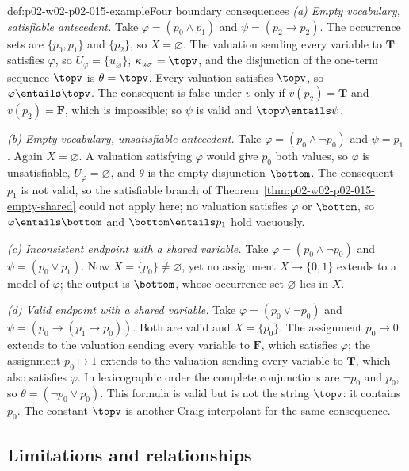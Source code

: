 \begin{hbexample}{def:p02-w02-p02-015-example}{Four boundary consequences}
\emph{(a) Empty vocabulary, satisfiable antecedent.}
Take \(\varphi=(p_0\land p_1)\) and \(\psi=(p_2\to p_2)\).  The occurrence
sets are \(\{p_0,p_1\}\) and \(\{p_2\}\), so \(X=\varnothing\).  The
valuation sending every variable to \(\mathbf{T}\) satisfies \(\varphi\), so
\(U_\varphi=\{u_\varnothing\}\), \(\kappa_{u_\varnothing}=\topv\), and the
disjunction of the one-term sequence \(\topv\) is \(\theta=\topv\).  Every
valuation satisfies \(\topv\), so \(\varphi\entails\topv\).  The consequent is
false under \(v\) only if \(v(p_2)=\mathbf{T}\) and \(v(p_2)=\mathbf{F}\), which is
impossible; so \(\psi\) is valid and \(\topv\entails\psi\).

\emph{(b) Empty vocabulary, unsatisfiable antecedent.}
Take \(\varphi=(p_0\land\neg p_0)\) and \(\psi=p_1\).  Again \(X=\varnothing\).
A valuation satisfying \(\varphi\) would give \(p_0\) both values, so
\(\varphi\) is unsatisfiable, \(U_\varphi=\varnothing\), and \(\theta\) is the
empty disjunction \(\bottom\).  The consequent \(p_1\) is not valid, so the
satisfiable branch of Theorem~\ref{thm:p02-w02-p02-015-empty-shared} could not
apply here; no valuation satisfies \(\varphi\) or \(\bottom\), so
\(\varphi\entails\bottom\) and \(\bottom\entails p_1\) hold vacuously.

\emph{(c) Inconsistent endpoint with a shared variable.}
Take \(\varphi=(p_0\land\neg p_0)\) and \(\psi=(p_0\lor p_1)\).  Now
\(X=\{p_0\}\neq\varnothing\), yet no assignment \(X\to\{0,1\}\) extends to
a model of \(\varphi\); the output is \(\bottom\), whose occurrence set
\(\varnothing\) lies in \(X\).

\emph{(d) Valid endpoint with a shared variable.}
Take \(\varphi=(p_0\lor\neg p_0)\) and \(\psi=(p_0\to(p_1\to p_0))\).  Both
are valid and \(X=\{p_0\}\).  The assignment \(p_0\mapsto 0\) extends to the
valuation sending every variable to \(\mathbf{F}\), which satisfies \(\varphi\);
the assignment \(p_0\mapsto 1\) extends to the valuation sending every
variable to \(\mathbf{T}\), which also satisfies \(\varphi\).  In lexicographic
order the complete conjunctions are \(\neg p_0\) and \(p_0\), so
\(\theta=(\neg p_0\lor p_0)\).  This formula is valid but is not the string
\(\topv\): it contains \(p_0\).  The constant \(\topv\) is another Craig
interpolant for the same consequence.
\end{hbexample}

\subsection{Limitations and relationships}
\label{sec:p02-w02-p02-015-relationships}

